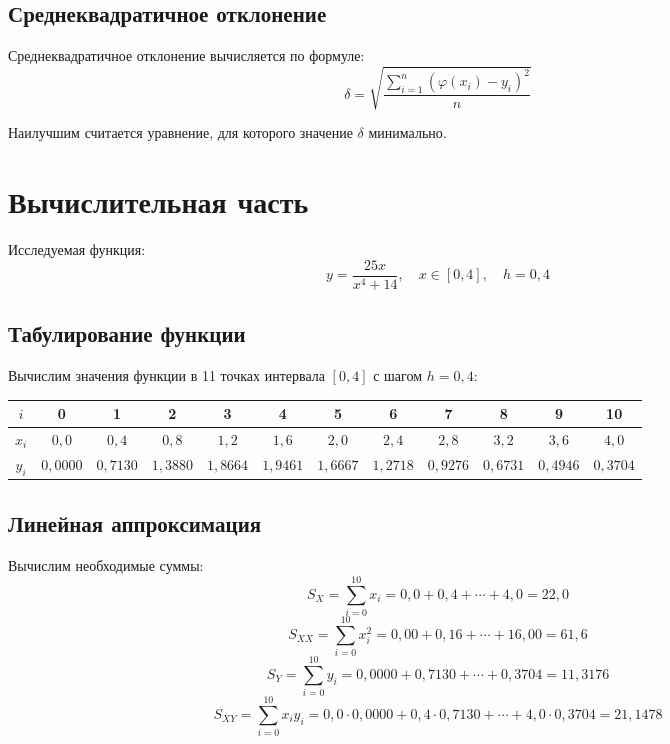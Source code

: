 \subsection{Среднеквадратичное отклонение}

Среднеквадратичное отклонение вычисляется по формуле:
\[
\delta = \sqrt{\frac{\sum_{i=1}^{n} (\varphi(x_i) - y_i)^2}{n}}
\]

Наилучшим считается уравнение, для которого значение $\delta$ минимально.

\section{Вычислительная часть}

Исследуемая функция:
\[
y = \frac{25x}{x^4 + 14},\quad x \in [0,4],\quad h = 0{,}4
\]

\subsection{Табулирование функции}

Вычислим значения функции в 11 точках интервала $[0, 4]$ с шагом $h = 0{,}4$:

\begin{table}[h!]
\centering
\label{tab:table}
\renewcommand{\arraystretch}{1.5}
\begin{tabular}{|c|c|c|c|c|c|c|c|c|c|c|c|}
\hline
$i$ & 0 & 1 & 2 & 3 & 4 & 5 & 6 & 7 & 8 & 9 & 10 \\
\hline
$x_i$ & $0{,}0$ & $0{,}4$ & $0{,}8$ & $1{,}2$ & $1{,}6$ & $2{,}0$ & $2{,}4$ & $2{,}8$ & $3{,}2$ & $3{,}6$ & $4{,}0$ \\
\hline
$y_i$ & $0{,}0000$ & $0{,}7130$ & $1{,}3880$ & $1{,}8664$ & $1{,}9461$ & $1{,}6667$ & $1{,}2718$ & $0{,}9276$ & $0{,}6731$ & $0{,}4946$ & $0{,}3704$ \\
\hline
\end{tabular}
\end{table}

\subsection{Линейная аппроксимация}

Вычислим необходимые суммы:
\[
S_X = \sum_{i=0}^{10} x_i = 0{,}0 + 0{,}4 + \cdots + 4{,}0 = 22{,}0
\]
\[
S_{XX} = \sum_{i=0}^{10} x_i^2 = 0{,}00 + 0{,}16 + \cdots + 16{,}00 = 61{,}6
\]
\[
S_Y = \sum_{i=0}^{10} y_i = 0{,}0000 + 0{,}7130 + \cdots + 0{,}3704 = 11{,}3176
\]
\[
S_{XY} = \sum_{i=0}^{10} x_i y_i = 0{,}0\cdot 0{,}0000 + 0{,}4\cdot 0{,}7130 + \cdots + 4{,}0\cdot 0{,}3704 = 21{,}1478
\]

